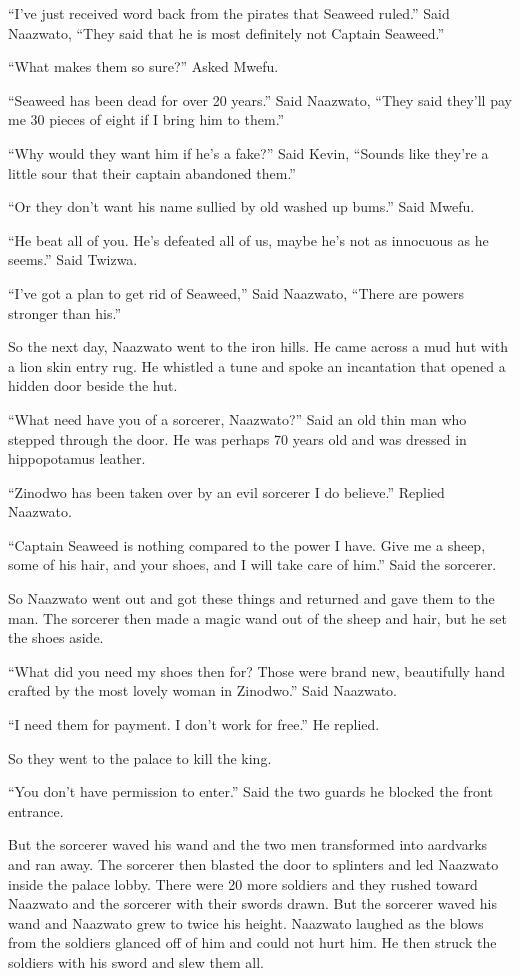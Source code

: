``I've just received word back from the pirates that Seaweed ruled.'' Said Naa\-zwa\-to, ``They said that he is most definitely not Captain Seaweed.''

``What makes them so sure?'' Asked Mwe\-fu.

``Seaweed has been dead for over 20 years.'' Said Naa\-zwa\-to, ``They said they'll pay me 30 pieces of eight if I bring him to them.''

``Why would they want him if he's a fake?'' Said Kevin, ``Sounds like they're a little sour that their captain abandoned them.''

``Or they don't want his name sullied by old washed up bums.'' Said Mwe\-fu.

``He beat all of you. He's defeated all of us, maybe he's not as innocuous as he seems.'' Said Twi\-zwa.

``I've got a plan to get rid of Seaweed,'' Said Naa\-zwa\-to, ``There are powers stronger than his.''

\tbreak

So the next day, Naa\-zwa\-to went to the iron hills. He came across a mud hut with a lion skin entry rug. He whistled a tune and spoke an incantation that opened a hidden door beside the hut.

``What need have you of a sorcerer, Naa\-zwa\-to?'' Said an old thin man who stepped through the door. He was perhaps 70 years old and was dressed in hippopotamus leather.

``Zi\-no\-dwo has been taken over by an evil sorcerer I do believe.'' Replied Naa\-zwa\-to.

``Captain Seaweed is nothing compared to the power I have. Give me a sheep, some of his hair, and your shoes, and I will take care of him.'' Said the sorcerer.

So Naa\-zwa\-to went out and got these things and returned and gave them to the man. The sorcerer then made a magic wand out of the sheep and hair, but he set the shoes aside.

``What did you need my shoes then for?
Those were brand new, beautifully hand crafted by the most lovely woman in Zi\-no\-dwo.'' Said Naa\-zwa\-to.

``I need them for payment. I don't work for free.'' He replied.

So they went to the palace to kill the king.

``You don't have permission to enter.'' Said the two guards he blocked the front entrance.

But the sorcerer waved his wand and the two men transformed into aardvarks and ran away. The sorcerer then blasted the door to splinters and led Naa\-zwa\-to inside the palace lobby. There were 20 more soldiers and they rushed toward Naa\-zwa\-to and the sorcerer with their swords drawn. But the sorcerer waved his wand and Naa\-zwa\-to grew to twice his height. Naa\-zwa\-to laughed as the blows from the soldiers glanced off of him and could not hurt him. He then struck the soldiers with his sword and slew them all.

